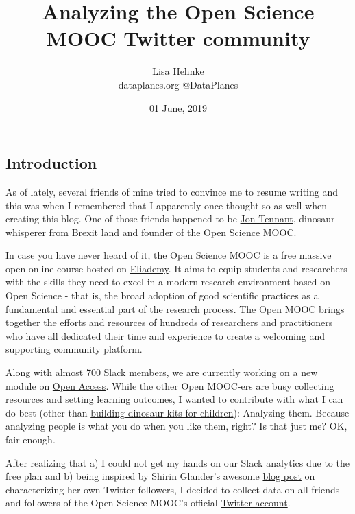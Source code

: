 \documentclass[]{article}
\title{Analyzing the Open Science MOOC Twitter community}
\author{Lisa Hehnke \\ dataplanes.org \textbar{} @DataPlanes}
\date{01 June, 2019}
\begin{document}
\maketitle

\subsection{Introduction}\label{introduction}

As of lately, several friends of mine tried to convince me to resume
writing and this was when I remembered that I apparently once thought so
as well when creating this blog. One of those friends happened to be
\href{http://fossilsandshit.com/}{Jon Tennant}, dinosaur whisperer from
Brexit land and founder of the \href{https://opensciencemooc.eu/}{Open
Science MOOC}.

In case you have never heard of it, the Open Science MOOC is a free
massive open online course hosted on
\href{https://eliademy.com/opensciencemooc}{Eliademy}. It aims to equip
students and researchers with the skills they need to excel in a modern
research environment based on Open Science - that is, the broad adoption
of good scientific practices as a fundamental and essential part of the
research process. The Open MOOC brings together the efforts and
resources of hundreds of researchers and practitioners who have all
dedicated their time and experience to create a welcoming and supporting
community platform.

Along with almost 700 \href{https://openmooc-ers.slack.com/}{Slack}
members, we are currently working on a new module on
\href{https://github.com/OpenScienceMOOC/Module-6-Open-Access-to-Research-Papers}{Open
Access}. While the other Open MOOC-ers are busy collecting resources and
setting learning outcomes, I wanted to contribute with what I can do
best (other than
\href{https://twitter.com/DataPlanes/status/1131308854258610176}{building
dinosaur kits for children}): Analyzing them. Because analyzing people
is what you do when you like them, right? Is that just me? OK, fair
enough.

After realizing that a) I could not get my hands on our Slack analytics
due to the free plan and b) being inspired by Shirin Glander's awesome
\href{https://shiring.github.io/text_analysis/2017/06/28/twitter_post}{blog
post} on characterizing her own Twitter followers, I decided to collect
data on all friends and followers of the Open Science MOOC's official
\href{https://twitter.com/opensciencemooc}{Twitter account}.
\end{document}
